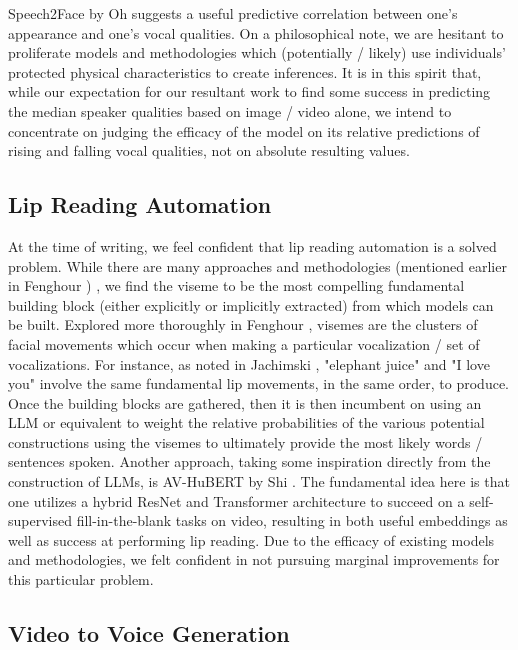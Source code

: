 \documentclass[10pt,twocolumn,letterpaper]{article}
\begin{document}
Speech2Face\cite{Speech2face} by Oh \etal suggests a useful predictive correlation between one's appearance and one's vocal qualities. On a philosophical note, we are hesitant to proliferate models and methodologies which (potentially / likely) use individuals' protected physical characteristics to create inferences. It is in this spirit that, while our expectation for our resultant work to find some success in predicting the median speaker qualities based on image / video alone, we intend to concentrate on judging the efficacy of the model on its relative predictions of rising and falling vocal qualities, not on absolute resulting values.

\subsection{Lip Reading Automation}

At the time of writing, we feel confident that lip reading automation is a solved problem. While there are many approaches and methodologies (mentioned earlier in Fenghour  \cite{Fenghour2021}) , we find the viseme to be the most compelling fundamental building block (either explicitly or implicitly extracted) from which models can be built. Explored more thoroughly in Fenghour \cite{Fenghour2023}, visemes are the clusters of facial movements which occur when making a particular vocalization / set of vocalizations. For instance, as noted in Jachimski  \cite{Elephant2017} , "elephant juice" and "I love you" involve the same fundamental lip movements, in the same order, to produce. Once the building blocks are gathered, then it is then incumbent on using an LLM or equivalent to weight the relative probabilities of the various potential constructions using the visemes to ultimately provide the most likely words / sentences spoken. Another approach, taking some inspiration directly from the construction of LLMs, is AV-HuBERT by Shi  \cite{AVHuBert}. The fundamental idea here is that one utilizes a hybrid ResNet and Transformer architecture to succeed on a self-supervised fill-in-the-blank tasks on video, resulting in both useful embeddings as well as success at performing lip reading. Due to the efficacy of existing models and methodologies, we felt confident in not pursuing marginal improvements for this particular problem.

\subsection{Video to Voice Generation}
\end{document}
